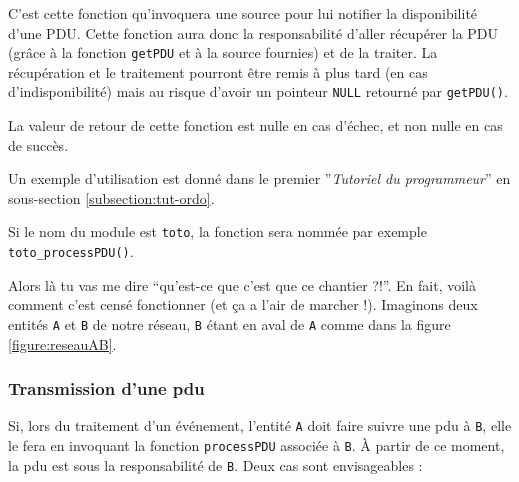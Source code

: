    C'est cette fonction qu'invoquera une source pour lui notifier la
disponibilité d'une PDU. Cette fonction aura donc la responsabilité
d'aller récupérer la PDU (grâce à la fonction \lstinline!getPDU! et à la source
fournies) et de la traiter. La récupération et le traitement pourront
être remis à plus tard (en cas d'indisponibilité) mais au risque
d'avoir un pointeur \lstinline!NULL! retourné par
\lstinline!getPDU()!.

   La valeur de retour de cette fonction est nulle en cas d'échec, et
non nulle en cas de succès.



   Un exemple d'utilisation est donné dans le premier ''{\em Tutoriel
     du programmeur}'' en sous-section \ref{subsection:tut-ordo}.

   Si le nom du module est {\tt toto}, la fonction sera nommée par exemple
{\tt toto\_processPDU()}.

   Alors là tu vas me dire ``qu'est-ce que c'est que ce chantier
?!''. En fait, voilà comment c'est censé fonctionner (et ça a l'air
de marcher !). Imaginons deux entités {\tt A} et {\tt B} de notre
réseau, {\tt B} étant en aval de {\tt A} comme dans la figure
\ref{figure:reseauAB}.

%
\subsubsection{Transmission d'une {\sc pdu}}

   Si, lors du traitement d'un événement, l'entité {\tt A} doit faire
suivre une {\sc pdu} à {\tt B}, elle le fera en invoquant la fonction
\lstinline!processPDU! associée à {\tt B}. À partir de ce moment, la
{\sc pdu} est sous la responsabilité de {\tt B}. Deux cas sont
envisageables : 

